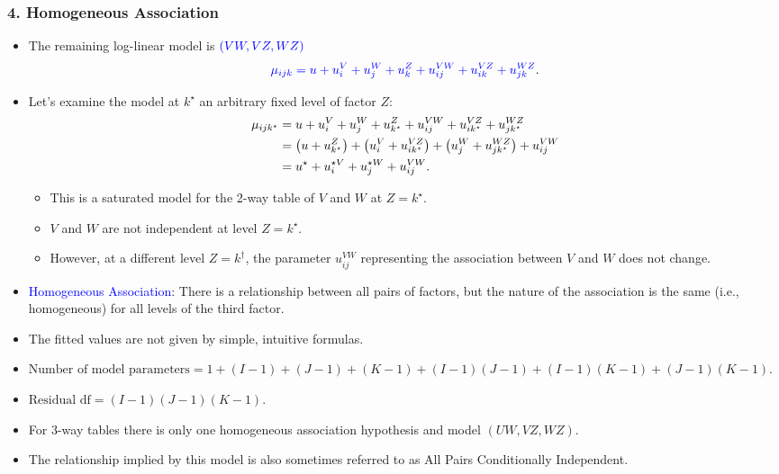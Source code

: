 \documentclass[oneside]{book}\usepackage[]{graphicx}\usepackage[svgnames]{xcolor}
\let\log\relax%
\begin{document}
\subsubsection*{4. Homogeneous Association}
\begin{itemize}
    \item The remaining log-linear model is $ \textcolor{Blue}{(VW,VZ,WZ)} $
          \[ \textcolor{Blue}{\log{\mu_{ijk}}=u+u_i^V+u_j^W+u_k^Z+u_{ij}^{VW}+u_{ik}^{VZ}+u_{jk}^{WZ}}. \]
    \item Let's examine the model at $ k^\star $ an arbitrary fixed level of factor $ Z $:
          \begin{align*}
              \log \mu_{i j k^{\star}} & =u+u_{i}^{V}+u_{j}^{W}+u_{k^{\star}}^{Z}+u_{i j}^{V W}+u_{i k^{\star}}^{V Z}+u_{j k^{\star}}^{W Z}                                        \\
                                       & =\left(u+u_{k^{\star}}^{Z}\right)+\left(u_{i}^{V}+u_{i k^{\star}}^{V Z}\right)+\left(u_{j}^{W}+u_{j k^{\star}}^{W Z}\right)+u_{i j}^{V W} \\
                                       & =u^{\star}+u_{i}^{\star V}+u_{j}^{\star W}+u_{i j}^{V W}.
          \end{align*}
          \begin{itemize}
              \item This is a saturated model for the 2-way table of $ V $ and $ W $ at $ Z=k^\star $.
              \item $ V $ and $ W $ are not independent at level $ Z=k^\star $.
              \item However, at a different level $ Z=k^\dagger $, the parameter $ u_{ij}^{VW} $ representing the association between $ V $ and $ W $
                    does not change.
          \end{itemize}
    \item \textcolor{Blue}{Homogeneous Association}: There is a relationship between all pairs of factors, but
          the nature of the association is the same (i.e., homogeneous) for all levels of the
          third factor.
    \item The fitted values are not given by simple, intuitive formulas.
    \item $ \text{Number of model parameters}=1 + (I- 1) + (J- 1) + (K- 1) + (I- 1)(J- 1) + (I- 1)(K- 1) + (J- 1)(K- 1) $.
    \item $ \text{Residual df}=(I- 1)(J- 1)(K- 1) $.
    \item For 3-way tables there is only one homogeneous association hypothesis and model
          $(UW, VZ, WZ)$.
    \item The relationship implied by this model is also sometimes referred to as All Pairs
          Conditionally Independent.
\end{itemize}
\end{document}
